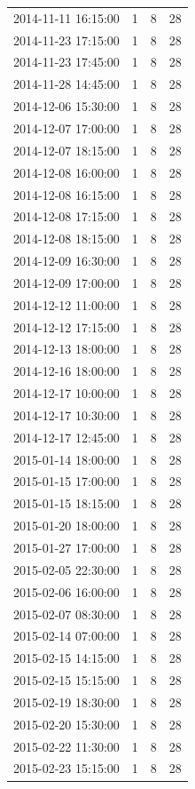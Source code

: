 \begin{tabular}{lrrr}
2014-11-11 16:15:00 & 1 & 8 & 28 \\
2014-11-23 17:15:00 & 1 & 8 & 28 \\
2014-11-23 17:45:00 & 1 & 8 & 28 \\
2014-11-28 14:45:00 & 1 & 8 & 28 \\
2014-12-06 15:30:00 & 1 & 8 & 28 \\
2014-12-07 17:00:00 & 1 & 8 & 28 \\
2014-12-07 18:15:00 & 1 & 8 & 28 \\
2014-12-08 16:00:00 & 1 & 8 & 28 \\
2014-12-08 16:15:00 & 1 & 8 & 28 \\
2014-12-08 17:15:00 & 1 & 8 & 28 \\
2014-12-08 18:15:00 & 1 & 8 & 28 \\
2014-12-09 16:30:00 & 1 & 8 & 28 \\
2014-12-09 17:00:00 & 1 & 8 & 28 \\
2014-12-12 11:00:00 & 1 & 8 & 28 \\
2014-12-12 17:15:00 & 1 & 8 & 28 \\
2014-12-13 18:00:00 & 1 & 8 & 28 \\
2014-12-16 18:00:00 & 1 & 8 & 28 \\
2014-12-17 10:00:00 & 1 & 8 & 28 \\
2014-12-17 10:30:00 & 1 & 8 & 28 \\
2014-12-17 12:45:00 & 1 & 8 & 28 \\
2015-01-14 18:00:00 & 1 & 8 & 28 \\
2015-01-15 17:00:00 & 1 & 8 & 28 \\
2015-01-15 18:15:00 & 1 & 8 & 28 \\
2015-01-20 18:00:00 & 1 & 8 & 28 \\
2015-01-27 17:00:00 & 1 & 8 & 28 \\
2015-02-05 22:30:00 & 1 & 8 & 28 \\
2015-02-06 16:00:00 & 1 & 8 & 28 \\
2015-02-07 08:30:00 & 1 & 8 & 28 \\
2015-02-14 07:00:00 & 1 & 8 & 28 \\
2015-02-15 14:15:00 & 1 & 8 & 28 \\
2015-02-15 15:15:00 & 1 & 8 & 28 \\
2015-02-19 18:30:00 & 1 & 8 & 28 \\
2015-02-20 15:30:00 & 1 & 8 & 28 \\
2015-02-22 11:30:00 & 1 & 8 & 28 \\
2015-02-23 15:15:00 & 1 & 8 & 28 \\

\end{tabular}
